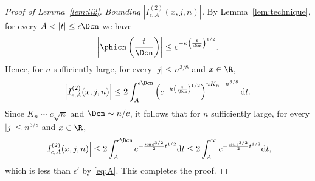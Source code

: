 \begin{proof}[Proof of Lemma~\ref{lem:ll2}]
 \emph{Bounding $|I^{(2)}_{\epsilon, {A} }(x,j,n)|$.}  By Lemma~\ref{lem:technique}, for every $A<|t| \leq \epsilon \Dcn$ we have \[  \left| \phicn \left(  \frac{t}{\Dcn} \right) \right|  \leq e^{-\kappa \left(  \frac{|t|}{\Dcn} \right) ^{1/2}}.\]
Hence, for $n$ sufficiently large, for every $|j| \leq n^{3/8}$ and $x \in \R$,
 \[ \left| I^{(2)}_{\epsilon,A}(x,j,n)  \right| \leq 2 \int_{A}^{\epsilon \Dcn}\left( e^{-\kappa  \left(  \frac{t}{\Dcn} \right) ^{1/2}} \right) ^{ uK_{n}  -n^{3/8}} \mathrm{d}t .\]
 Since $K_{n} \sim c \sqrt{n}$ and $ \Dcn\sim  n /c$, it follows that for $n$ sufficiently large, for every $|j| \leq n^{3/8}$ and $x \in \R$,
  \[ \left| I^{(2)}_{\epsilon,A}(x,j,n) \right| \leq 2 \int_{A}^{\epsilon \Dcn}  e^{- \frac{\kappa u  c^{3/2}}{2} t^{1/2}} \mathrm{d}t  \leq 2 \int_{A}^{\infty} e^{- \frac{\kappa u c^{3/2}}{2} t^{1/2}} \mathrm{d}t,\]
  which is less than $\epsilon'$ by \eqref{eq:A}.   This completes the proof.
  \end{proof}
